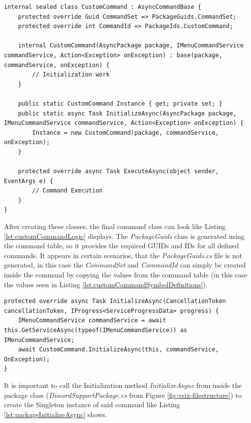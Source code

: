 \begin{lstlisting}[style=CSharp, caption={Custom command}, label={lst:customCommandLogic}]
internal sealed class CustomCommand : AsyncCommandBase {
	protected override Guid CommandSet => PackageGuids.CommandSet;
	protected override int CommandId => PackageIds.CustomCommand;
		
	internal CustomCommand(AsyncPackage package, IMenuCommandService commandService, Action<Exception> onException) : base(package, commandService, onException) {
		// Initialization work
	}
	
	public static CustomCommand Instance { get; private set; }
	public static async Task InitializeAsync(AsyncPackage package, IMenuCommandService commandService, Action<Exception> onException) {
		Instance = new CustomCommand(package, commandService, onException);
	}
	
	protected override async Task ExecuteAsync(object sender, EventArgs e) {
		// Command Execution
	}
}
\end{lstlisting}
After creating these classes, the final command class can look like Listing \ref{lst:customCommandLogic} displays.
The \textit{PackageGuids} class is generated using the command table, so it provides the required GUIDs and IDs for all defined commands. It appears in certain scenarios, that the \textit{PackageGuids.cs} file is not generated, in this case the \textit{CommandSet} and \textit{CommandId} can simply be created inside the command by copying the values from the command table (in this case the values seen in Listing \ref{lst:customCommandSymbolDefinitions}).
\newpage 
\begin{lstlisting}[style=CSharp, caption={Calling command's InitializeAsync in package initialization}, label={lst:packageInitializeAsync}]
protected override async Task InitializeAsync(CancellationToken cancellationToken, IProgress<ServiceProgressData> progress) {
	IMenuCommandService commandService = await this.GetServiceAsync(typeof(IMenuCommandService)) as IMenuCommandService;
	await CustomCommand.InitializeAsync(this, commandService, OnException);
} 
\end{lstlisting}
It is important to call the Initialization method \textit{InitializeAsync} from inside the package class (\textit{DiscordSupportPackage.cs} from Figure \ref{fig:vsix-filestructure}) to create the Singleton instance of said command like Listing \ref{lst:packageInitializeAsync} shows.
\citep{vsixCookbook}

